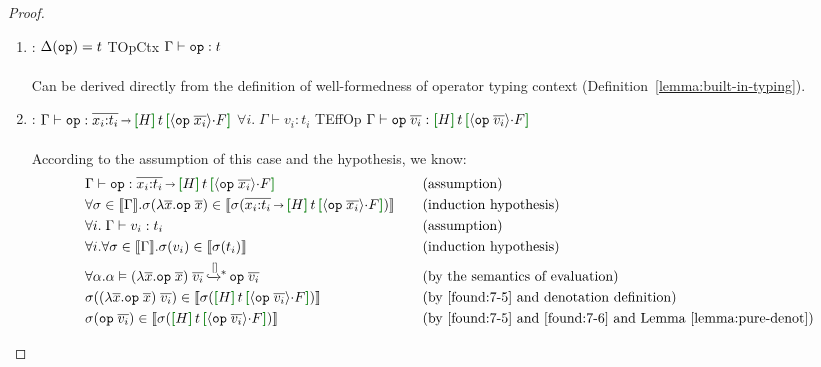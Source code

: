 \begin{proof}
\begin{enumerate}[label=Case]
{{$\Delta(\primop) = t$}
{TPureOp}
{$\Gamma \vdash \primop : t$}
\ \\ \ \\}
Can be derived directly from the definition of well-formedness of pure operator typing context (Definition~\ref{lemma:built-in-pure-typing}).
\item:
{\footnotesize
\mprooftr{15mm}
{$\Delta(\boldsymbol{{\tt op}}) = t$}
{TOpCtx}
{$\Gamma\vdash \boldsymbol{{\tt op}} : t$}
\ \\ \ \\}
Can be derived directly from the definition of well-formedness of operator typing context (Definition~\ref{lemma:built-in-typing}).
\item:
{\footnotesize
\mprooftr{58mm}
  {
  $\Gamma \vdash \eff{op} : \overline{x_i{:}t_i}\sarr \uhat{H}{t}{\msgA{op}{\overline{x_i}} \seqA F}$ \quad
  $\forall i. \;\Gamma \vdash v_i : t_i$}
  {TEffOp}
  {$\Gamma\vdash \eff{op}{\;\overline{v_i}} : \uhat{H}{t}{\msgA{op}{\overline{v_i}} \seqA F}$}
\ \\ \ \\}
According to the assumption of this case and the hypothesis, we know:
{\footnotesize\begin{alignat}{2}
  \setcounter{equation}{0}
  &\Gamma \vdash \eff{op} : \overline{x_i{:}t_i}\sarr \uhat{H}{t}{\msgA{op}{\overline{x_i}} \seqA F} \ptag{assumption} \label{found:7-1} \\
  &\forall \sigma \in \denot{\Gamma}. \sigma(\lambda \overline{x}.\eff{op}\;\overline{x}) \in \denot{\sigma(\overline{x_i{:}t_i}\sarr \uhat{H}{t}{\msgA{op}{\overline{x_i}} \seqA F})} \ptag{induction hypothesis} \label{found:7-2} \\
  &\forall i. \;\Gamma \vdash v_i : t_i \ptag{assumption} \label{found:7-3} \\
  &\forall i.\forall \sigma \in \denot{\Gamma}. \sigma(v_i) \in \denot{\sigma(t_i)} \ptag{induction hypothesis} \label{found:7-4} \\
  &\forall \alpha. \msteptr{\alpha}{(\lambda \overline{x}.\eff{op}\;\overline{x}) \; \overline{v_i}}{[]}{\eff{op}\; \overline{v_i}}\ptag{by the semantics of evaluation} \label{found:7-5} \\
  &\sigma((\lambda \overline{x}.\eff{op}\;\overline{x}) \; \overline{v_i}) \in \denot{\sigma(\uhat{H}{t}{\msgA{op}{\overline{v_i}} \seqA F})} \ptag{by  \ref{found:7-5} and denotation definition} \label{found:7-6} \\
  &\sigma(\eff{op}\; \overline{v_i}) \in \denot{\sigma(\uhat{H}{t}{\msgA{op}{\overline{v_i}} \seqA F})} \ptag{by \ref{found:7-5} and \ref{found:7-6} and Lemma~\ref{lemma:pure-denot}} \label{found:7-7}

\end{alignat}}
\end{enumerate}
\end{proof}
